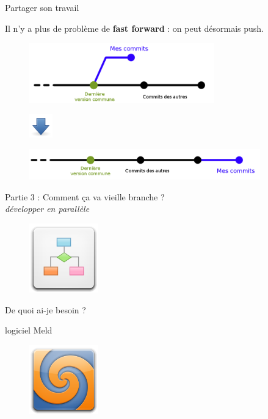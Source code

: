 \documentclass{beamer}
\begin{document}
\begin{frame}{Partager son travail}
	
	Il n'y a plus de problème de \textbf{fast forward} : on peut désormais push.
	\begin{figure}
		\centering
		\includegraphics[width=8cm]{img/repo6}
	\end{figure}
	\vspace{-.6cm}
	\begin{figure}
		\centering
		\includegraphics[height=1cm]{img/down}
	\end{figure}
	\vspace{-.9cm}
	\begin{figure}
		\centering
		\includegraphics[width=10cm]{img/repo8}
	\end{figure}
\end{frame}

\begin{frame}
	\begin{center}
 		\Large{Partie 3 : Comment ça va vieille branche ?}\\
 		{\small  \textit{développer en parallèle}}
	\end{center}

	\begin{figure}
		\centering
		\includegraphics[height=3cm]{img/diagram}
	\end{figure}
\end{frame}

\begin{frame}{De quoi ai-je besoin ?}
	\begin{center}
 		\Large{logiciel Meld}\\
	\end{center}

	\begin{figure}
		\centering
		\includegraphics[height=3cm]{img/meld}
	\end{figure}
\end{frame}
\end{document}
